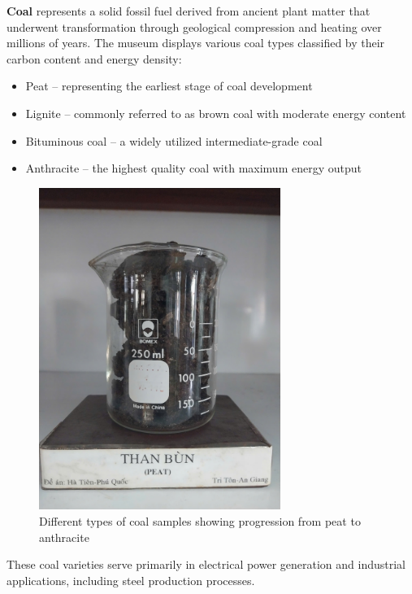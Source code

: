 \textbf{Coal} represents a solid fossil fuel derived from ancient plant matter that underwent transformation through geological compression and heating over millions of years. The museum displays various coal types classified by their carbon content and energy density:
\begin{itemize}
    \item Peat -- representing the earliest stage of coal development
    \item Lignite -- commonly referred to as brown coal with moderate energy content
    \item Bituminous coal -- a widely utilized intermediate-grade coal
    \item Anthracite -- the highest quality coal with maximum energy output
\end{itemize}

\begin{figure}[H]
\centering
\includegraphics[width=0.7\textwidth]{graphics/coal_types.png}
\caption{Different types of coal samples showing progression from peat to anthracite}
\label{fig:coal_types}
\end{figure}

These coal varieties serve primarily in electrical power generation and industrial applications, including steel production processes.

